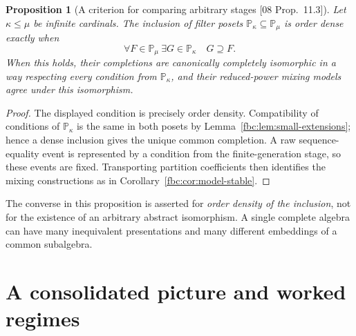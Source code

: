 \documentclass[11pt,letterpaper]{article}
\newtheorem{proposition}[theorem]{Proposition}
\theoremstyle{definition}
\theoremstyle{remark}
\newcommand{\PP}{\mathbb P}
\newcommand{\src}[1]{\textup{[#1]}}
\begin{document}
\begin{proposition}[A criterion for comparing arbitrary stages \src{08 Prop.~11.3}]
\label{fbc:prop:intermediate}
Let $\kappa\leq\mu$ be infinite cardinals. The inclusion of
filter posets $\PP_\kappa\subseteq\PP_\mu$ is order dense
exactly when
\begin{equation}\label{fbc:eq:intermediate-criterion}
 \forall F\in\PP_\mu\ \exists G\in\PP_\kappa\quad G\supseteq F.
\end{equation}
When this holds, their completions are canonically completely
isomorphic in a way respecting every condition from
$\PP_\kappa$, and their reduced-power mixing models agree under
this isomorphism.
\end{proposition}
\begin{proof}
The displayed condition is precisely order density. Compatibility
of conditions of $\PP_\kappa$ is the same in both posets by
Lemma~\ref{fbc:lem:small-extensions}; hence a dense inclusion gives
the unique common completion. A raw sequence-equality event is
represented by a condition from the finite-generation stage, so
these events are fixed. Transporting partition coefficients then
identifies the mixing constructions as in
Corollary~\ref{fbc:cor:model-stable}.
\end{proof}

The converse in this proposition is asserted for \emph{order density
of the inclusion}, not for the existence of an arbitrary abstract
isomorphism. A single complete algebra can have many inequivalent
presentations and many different embeddings of a common subalgebra.

\section{A consolidated picture and worked regimes}
\label{fbc:sec:picture}
\end{document}
